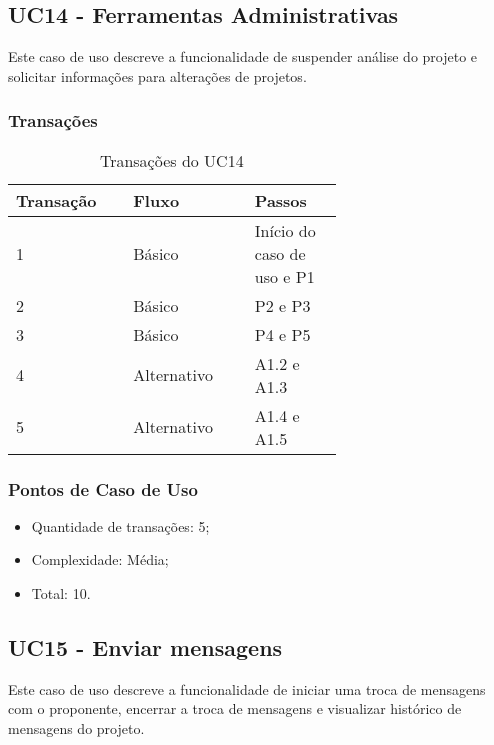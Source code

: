 \pagebreak
\subsection{UC14 - Ferramentas Administrativas}
   
  Este caso de uso descreve a funcionalidade de suspender análise do projeto e solicitar informações para alterações de projetos.
  
  \subsubsection{Transações}

  \begin{table*}[!h]
  \centering
  \caption{Transações do UC14}
  \label{uc14_transactions}
    \begin{tabular}{|p{0.20\linewidth}|p{0.25\linewidth}|p{0.20\linewidth}|}
    \hline
    \textbf{Transação} & \textbf{Fluxo} & \textbf{Passos} \\ 
    \hline
    1 & Básico & Início do caso de uso e P1\\
    \hline
    2 & Básico & P2 e P3\\
    \hline
    3 & Básico & P4 e P5\\
    \hline
    4 & Alternativo & A1.2 e A1.3\\
    \hline
    5 & Alternativo & A1.4 e A1.5\\
    \hline
    \end{tabular}
  \end{table*}

  \subsubsection{Pontos de Caso de Uso}

  \begin{itemize}
  \item Quantidade de transações: 5;
  \item Complexidade: Média;
  \item Total: 10.
  \end{itemize}

 
\subsection{UC15 - Enviar mensagens}
  
  Este caso de uso descreve a funcionalidade de iniciar uma troca de
  mensagens com o proponente, encerrar a troca de mensagens e visualizar histórico de mensagens do projeto. 
  
